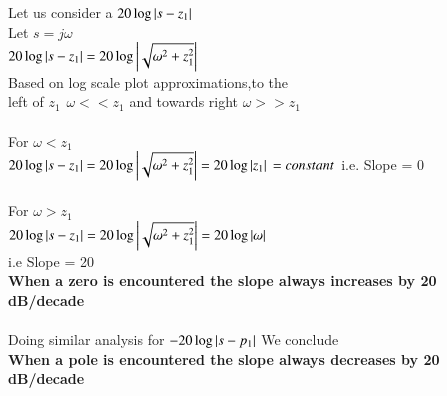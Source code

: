 \begin{left}


Let us consider a $ 20\log \left\vert s-z_{1}\right\vert $
\\
Let $s = j\omega$
\\
$ 20\log \left\vert s-z_{1}\right\vert = 20\log \left\vert\sqrt{\omega^{2} + z_{1}^{2}}\right\vert $
\\
Based on log scale plot approximations,to the 
\\
left of $z_{1} \hspace{5pt} \omega << z_{1} $ and towards right  $ \omega >> z_{1} $
\\ \\
For $\omega < z_{1}$
\\
$ 20\log \left\vert s-z_{1}\right\vert = 20\log \left\vert\sqrt{\omega^{2} + z_{1}^{2}}\right\vert = 20 \log \left\vert z_{1}\right\vert 
\\
= constant $ i.e. Slope = 0
\\
\\
For $\omega > z_{1}$
\\
$ 20\log \left\vert s-z_{1}\right\vert = 20\log \left\vert\sqrt{\omega^{2} + z_{1}^{2}}\right\vert = 20 \log \left\vert\omega\right\vert $
\\
i.e Slope = 20
\\
\textbf{When a zero is encountered the slope always increases by 20 dB/decade}
\\
\\
Doing similar analysis for $ - 20\log \left\vert s-p_{1}\right\vert $  We conclude
\\
\textbf{When a pole is encountered the slope always decreases by 20 dB/decade}
\\
\end{left}

